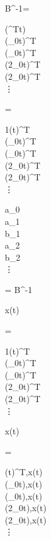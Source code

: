 \begin{abox}
	B^{-1}= \begin{pmatrix}
		 \cdot  {}(^Tt)\\
		 \cdot \cos(\omega_0t)^T\\
		 \cdot \sin(\omega_0t)^T\\
		 \cdot \cos(2\omega_0t)^T\\
		 \cdot \sin(2\omega_0t)^T\\
		\vdots
	\end{pmatrix} =
	\frac{2}{T} 
	\begin{pmatrix}
		1(t)^T\\
		\cos(\omega_0t)^T\\
		\sin(\omega_0t)^T\\
		\cos(2\omega_0t)^T\\
		\sin(2\omega_0t)^T\\
		\vdots
	\end{pmatrix}
\end{abox}


\begin{abox}
	\begin{pmatrix}
		a_0\\
		a_1\\
		b_1\\
		a_2\\
		b_2\\
		\vdots
	\end{pmatrix} = B^{-1} \cdot \begin{pmatrix}
		x(t)
	\end{pmatrix} =  
	\begin{pmatrix}
		1(t)^T\\
		\cos(\omega_0t)^T\\
		\sin(\omega_0t)^T\\
		\cos(2\omega_0t)^T\\
		\sin(2\omega_0t)^T\\
		\vdots
	\end{pmatrix} \cdot \begin{pmatrix}
		x(t)
	\end{pmatrix} = \frac{2}{T} 
	\begin{pmatrix}
		(t)^T,x(t)\rangle\\
		\langle \cos(\omega_0t),x(t)\rangle\\
		\langle \sin(\omega_0t),x(t)\rangle\\
		\langle \cos(2\omega_0t),x(t)\rangle\\
		\langle \sin(2\omega_0t),x(t)\rangle\\
		\vdots
	\end{pmatrix}
\end{abox}

